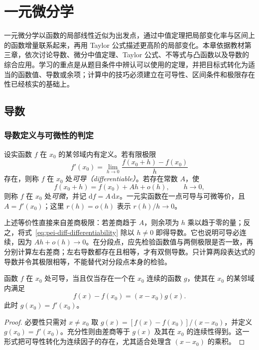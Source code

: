 \setcounter{chapter}{2} %
\chapter{一元微分学}
\label{chap:pei-diff}

一元微分学以函数的局部线性近似为出发点，通过中值定理把局部变化率与区间上的函数增量联系起来，再用 Taylor 公式描述更高阶的局部变化。本章依据教材第三章，依次讨论导数、微分中值定理、Taylor 公式、不等式与凸函数以及导数的综合应用。学习的重点是从题目条件中辨认可以使用的定理，并把目标式转化为适当的函数值、导数或余项；计算中的技巧必须建立在可导性、区间条件和极限存在性已经核实的基础上。

\section{导数}
\label{sec:pei-diff-derivative}

\subsection{导数定义与可微性的判定}

\begin{definition}
设实函数 $f$ 在 $x_0$ 的某邻域内有定义。若有限极限
\begin{equation}
  f'(x_0)=\lim_{h\to0}\frac{f(x_0+h)-f(x_0)}{h}
  \label{eq:pei-diff-derivative-definition}
\end{equation}
存在，则称 $f$ 在 $x_0$ 处\emph{可导（differentiable）}。若存在常数 $A$，使
\begin{equation}
  f(x_0+h)=f(x_0)+Ah+o(h),\qquad h\to0,
  \label{eq:pei-diff-differentiability}
\end{equation}
则称 $f$ 在 $x_0$ 处\emph{可微}，并记 $\mathrm{d}f=A\,\mathrm{d}x$。一元实函数在一点可导与可微等价，且 $A=f'(x_0)$；这里 $r(h)=o(h)$ 表示 $r(h)/h\to0$。
\end{definition}

上述等价性直接来自差商极限：若差商趋于 $A$，则余项为 $h$ 乘以趋于零的量；反之，将式~\eqref{eq:pei-diff-differentiability} 除以 $h\ne0$ 即得导数。它也说明可导必连续，因为 $Ah+o(h)\to0$。在分段点，应先检验函数值与两侧极限是否一致，再分别计算左右差商；左右导数都存在且相等，才有双侧导数。只计算两段表达式的导数并令其极限相等，不能替代对分段点本身的检验。

\begin{proposition}
\label{prop:pei-diff-caratheodory}
函数 $f$ 在 $x_0$ 处可导，当且仅当存在一个在 $x_0$ 连续的函数 $g$，使其在 $x_0$ 的某邻域内满足
\[
  f(x)-f(x_0)=(x-x_0)g(x).
\]
此时 $g(x_0)=f'(x_0)$。
\end{proposition}
\begin{proof}
必要性只需对 $x\ne x_0$ 取 $g(x)=[f(x)-f(x_0)]/(x-x_0)$，并定义 $g(x_0)=f'(x_0)$。充分性则由差商等于 $g(x)$ 及其在 $x_0$ 的连续性得到。这一形式把可导性转化为连续因子的存在，尤其适合处理含 $(x-x_0)$ 的乘积。
\end{proof}

